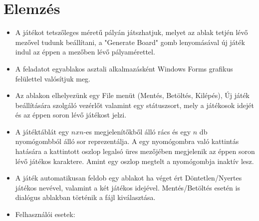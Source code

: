 \documentclass[11pt,a4paper]{article}
\begin{document}
\section{Elemzés}
\begin{itemize}
	\item A játékot tetszőleges méretű pályán játszhatjuk, melyet az ablak tetjén lévő
	mezővel tudunk beállítani, a "Generate Board" gomb lenyomásával új játék indul az
	éppen a mezőben lévő pályamérettel.
	\item A feladatot egyablakos asztali alkalmazásként Windows Forms grafikus felülettel
	valósítjuk meg.
	\item Az ablakon elhelyezünk egy File menüt (Mentés, Betöltés, Kilépés), Új játék
	beállítására szolgáló vezérlőt valamint egy státuszsort, mely a játékosok idejét és
	az éppen soron lévő játékost jelzi.
	\item A játéktáblát egy $nxn$-es megjelenítőkből álló rács és egy $n$ db nyomógombból
	álló sor reprezentálja. A egy nyomógombra való kattintás hatására a kattintott oszlop
	legalsó üres mezőjében megjelenik az éppen soron lévő játékos karaktere. Amint egy
	oszlop megtelt a nyomógombja inaktív lesz.
	\item A játék automatikusan feldob egy ablakot ha véget ért Döntetlen/Nyertes játékos
	nevével, valamint a két játékos idejével. Mentés/Betöltés esetén is dialógus ablakban
	történik a fájl kiválasztása.
	\item Felhasználói esetek:
\end{itemize}
\end{document}
